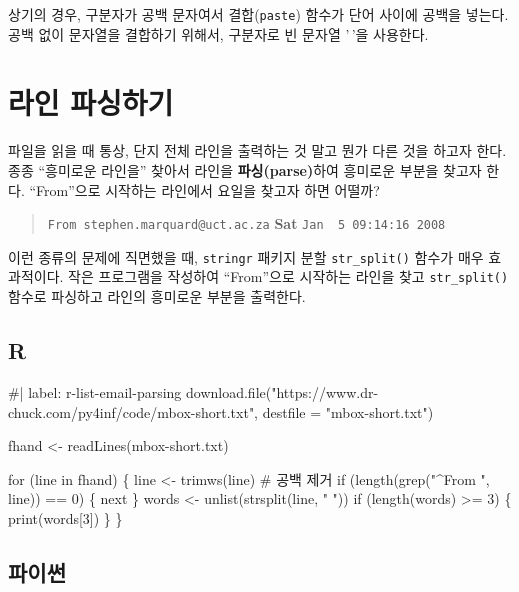 \documentclass[
  letterpaper,
]{book}
\newenvironment{Shaded}{\begin{snugshade}}{\end{snugshade}}
\newcommand{\NormalTok}[1]{\textcolor[rgb]{0.00,0.23,0.31}{#1}}
\begin{document}
상기의 경우, 구분자가 공백 문자여서 결합(\texttt{paste}) 함수가 단어
사이에 공백을 넣는다. 공백 없이 문자열을 결합하기 위해서, 구분자로 빈
문자열 '\,'을 사용한다.  

\section{라인 파싱하기}\label{r-list-parsing}

파일을 읽을 때 통상, 단지 전체 라인을 출력하는 것 말고 뭔가 다른 것을
하고자 한다. 종종 ``흥미로운 라인을'' 찾아서 라인을
\textbf{파싱(parse)}하여 흥미로운 부분을 찾고자 한다. ``From''으로
시작하는 라인에서 요일을 찾고자 하면 어떨까?

\begin{quote}
\texttt{From\ stephen.marquard@uct.ac.za} \textbf{Sat}
\texttt{Jan\ \ 5\ 09:14:16\ 2008}
\end{quote}

이런 종류의 문제에 직면했을 때, \texttt{stringr} 패키지 분할
\texttt{str\_split()} 함수가 매우 효과적이다. 작은 프로그램을 작성하여
``From''으로 시작하는 라인을 찾고 \texttt{str\_split()} 함수로 파싱하고
라인의 흥미로운 부분을 출력한다.

\subsection{R}

\begin{Shaded}
\begin{Highlighting}[]
\NormalTok{\#| label: r{-}list{-}email{-}parsing}
\NormalTok{download.file("https://www.dr{-}chuck.com/py4inf/code/mbox{-}short.txt",}
\NormalTok{              destfile = "mbox{-}short.txt")}

\NormalTok{fhand \textless{}{-} readLines(\textquotesingle{}mbox{-}short.txt\textquotesingle{})}

\NormalTok{for (line in fhand) \{}
\NormalTok{    line \textless{}{-} trimws(line)  \# 공백 제거}
\NormalTok{    if (length(grep("\^{}From ", line)) == 0) \{}
\NormalTok{        next}
\NormalTok{    \}}
\NormalTok{    words \textless{}{-} unlist(strsplit(line, " "))}
\NormalTok{    if (length(words) \textgreater{}= 3) \{}
\NormalTok{        print(words[3])}
\NormalTok{    \}}
\NormalTok{\}}
\end{Highlighting}
\end{Shaded}

\subsection{파이썬}
\end{document}
